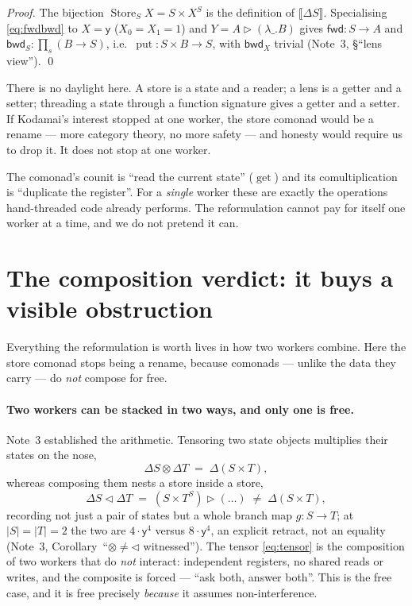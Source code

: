 \documentclass[11pt]{article}
\newcommand{\ctr}{\mathbin{\triangleright}}      %
\newcommand{\ext}[1]{\llbracket #1 \rrbracket}    %
\newcommand{\comp}{\mathbin{\triangleleft}}       %
\newcommand{\fwd}{\mathsf{fwd}}
\newcommand{\bwd}{\mathsf{bwd}}
\newcommand{\y}{\mathsf{y}}
\DeclareMathOperator{\Store}{Store}
\DeclareMathOperator{\getop}{get}
\DeclareMathOperator{\putop}{put}
\theoremstyle{plain}
\theoremstyle{definition}
\begin{document}
\begin{proof}
The bijection $\Store_S X = S\times X^S$ is the definition of $\ext{\Delta S}$. Specialising
\eqref{eq:fwdbwd} to $X=\y$ ($X_0=X_1=1$) and $Y=A\ctr(\lambda\_.B)$ gives $\fwd:S\to A$ and
$\bwd_S:\prod_{s}(B\to S)$, i.e.\ $\putop:S\times B\to S$, with $\bwd_X$ trivial (Note~3,
\S``lens view''). \qed
\end{proof}

\noindent There is no daylight here. A store is a state and a reader; a lens is a getter and a
setter; threading a state through a function signature gives a getter and a setter. If Kodamai's
interest stopped at one worker, the store comonad would be a rename --- more category theory, no more
safety --- and honesty would require us to drop it. It does not stop at one worker.

\begin{deepbox}
The comonad's counit is ``read the current state'' ($\getop$) and its comultiplication is
``duplicate the register''. For a \emph{single} worker these are exactly the operations
hand-threaded code already performs. The reformulation cannot pay for itself one worker at a time,
and we do not pretend it can.
\end{deepbox}

\section{The composition verdict: it buys a visible obstruction}\label{sec:compose}

Everything the reformulation is worth lives in how two workers combine. Here the store comonad stops
being a rename, because comonads --- unlike the data they carry --- do \emph{not} compose for free.

\paragraph{Two workers can be stacked in two ways, and only one is free.} Note~3 established the
arithmetic. Tensoring two state objects multiplies their states on the nose,
\begin{equation}\label{eq:tensor}
  \Delta S\otimes\Delta T \;=\; \Delta(S\times T),
\end{equation}
whereas composing them nests a store inside a store,
\begin{equation}\label{eq:nest}
  \Delta S\comp\Delta T \;=\; (S\times T^{S})\ctr(\dots)\;\neq\;\Delta(S\times T),
\end{equation}
recording not just a pair of states but a whole branch map $g:S\to T$; at $|S|=|T|=2$ the two are
$4\cdot\y^4$ versus $8\cdot\y^4$, an explicit retract, not an equality (Note~3,
Corollary~``$\otimes\neq\comp$ witnessed''). The tensor \eqref{eq:tensor} is the composition of two
workers that do \emph{not} interact: independent registers, no shared reads or writes, and the
composite is forced --- ``ask both, answer both''. This is the free case, and it is free precisely
\emph{because} it assumes non-interference.
\end{document}
